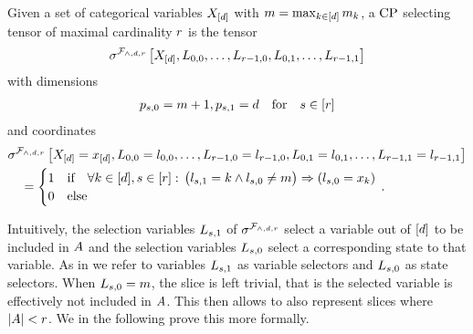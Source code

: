\begin{definition}
    \label{def:cpSelection}
    Given a set of categorical variables $X_{[d]}$ with $m=\max_{k\in[d]}m_{k}$, a $\mathrm{CP}$ selecting tensor of maximal cardinality $r$ is the tensor
    \begin{align*}
        \sigma^{\mathcal{F}_{\land,d,r}}\left[X_{[d]},L_{0,0},\ldots,L_{r-1,0},L_{0,1},\ldots,L_{r-1,1}\right]
    \end{align*}
    with dimensions
    \begin{align*}
        p_{s,0} = m+1, p_{s,1} = d \quad \text{for} \quad s\in[r]
    \end{align*}
    and coordinates
    \begin{align*}
        & \sigma^{\mathcal{F}_{\land,d,r}}\left[X_{[d]}=x_{[d]},L_{0,0}=l_{0,0},\ldots,L_{r-1,0}=l_{r-1,0},L_{0,1}=l_{0,1},\ldots,L_{r-1,1}=l_{r-1,1}\right] \\
        & \quad = \begin{cases}
                      1 & \text{if}\quad
                      \forall{k\in[d],s\in[r]} : \, \big(l_{s,1} = k \land l_{s,0} \neq m \big) \Rightarrow  (l_{s,0} = x_{k})  \\
                      0 & \text{else}
        \end{cases} \, .
    \end{align*}
\end{definition}

Intuitively, the selection variables $L_{s,1}$ of $\sigma^{\mathcal{F}_{\land,d,r}}$ select a variable out of $[d]$ to be included in $A$ and the selection variables $L_{s,0}$ select a corresponding state to that variable.
As in  we refer to variables $L_{s,1}$ as variable selectors and $L_{s,0}$ as state selectors.
When $L_{s,0}=m$, the slice is left trivial, that is the selected variable is effectively not included in $A$.
This then allows to also represent slices where $\left|A\right|<r$.
We in the following prove this more formally.

